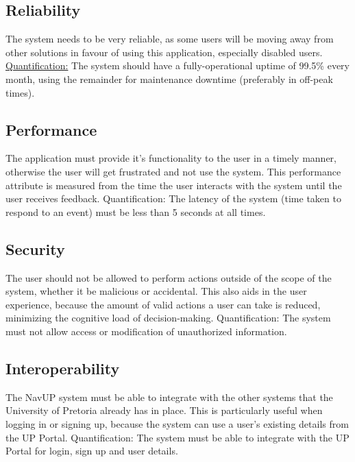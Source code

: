 \documentclass[english]{article}
\begin{document}
	\subsection{Reliability}
	The system needs to be very reliable, as some users will be moving away from other solutions in favour of using this application, especially disabled users.
	\newline
	\newline
	\underline{Quantification:} The system should have a fully-operational uptime of 99.5\% every month, using the remainder for maintenance downtime (preferably in off-peak times).
	\subsection{Performance}
	The application must provide it's functionality to the user in a timely manner, otherwise the user will get frustrated and not use the system. This performance attribute is measured from the time the user interacts with the system until the user receives feedback.
	\newline
	\newline
	{Quantification:} The latency of the system (time taken to respond to an event) must be less than 5 seconds at all times.
	\subsection{Security}
	The user should not be allowed to perform actions outside of the scope of the system, whether it be malicious or accidental. This also aids in the user experience, because the amount of valid actions a user can take is reduced, minimizing the cognitive load of decision-making.
	\newline
	\newline
	{Quantification:} The system must not allow access or modification of unauthorized information.
	\subsection{Interoperability}
	The NavUP system must be able to integrate with the other systems that the University of Pretoria already has in place. This is particularly useful when logging in or signing up, because the system can use a user's existing details from the UP Portal.
	\newline
	\newline
	{Quantification:} The system must be able to integrate with the UP Portal for login, sign up and user details.
	
\end{document}
